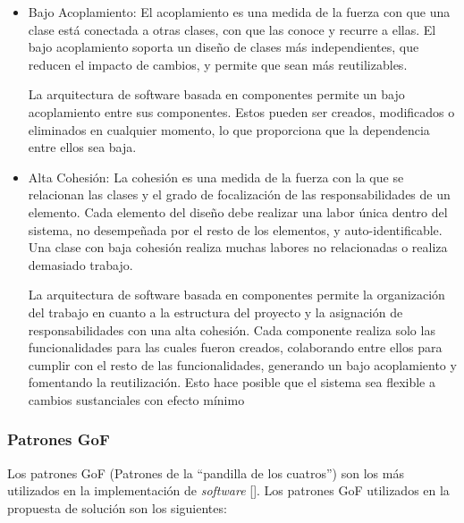 \begin{itemize}
\item Bajo Acoplamiento: El acoplamiento es una medida de la fuerza con que una clase está conectada a otras clases, con que las conoce y recurre a ellas. El bajo acoplamiento soporta un diseño de clases más independientes, que reducen el impacto de cambios, y permite que sean más reutilizables.

La arquitectura de software basada en componentes permite un bajo acoplamiento entre sus componentes. Estos pueden ser creados, modificados o eliminados en cualquier momento, lo que proporciona que la dependencia entre ellos sea baja.

\item Alta Cohesión: La cohesión es una medida de la fuerza con la que se relacionan las clases y el grado de focalización de las responsabilidades de un elemento. Cada elemento del diseño debe realizar una labor única dentro del sistema, no desempeñada por el resto de los elementos, y auto-identificable. Una clase con baja cohesión realiza muchas labores no relacionadas o realiza demasiado trabajo.

La arquitectura de software basada en componentes permite la organización del trabajo en cuanto a la estructura del proyecto y la asignación de responsabilidades con una alta cohesión. Cada componente realiza solo las funcionalidades para las cuales fueron creados, colaborando entre ellos para cumplir con el resto de las funcionalidades, generando un bajo acoplamiento y fomentando la reutilización. Esto hace posible que el sistema sea flexible a cambios sustanciales con efecto mínimo
\end{itemize}

\subsubsection{Patrones GoF}
Los patrones GoF (Patrones de la ``pandilla de los cuatros'') son los más utilizados en la implementación de \textit{software} [\cite{97}]. Los patrones GoF utilizados en la propuesta de solución son los siguientes:

